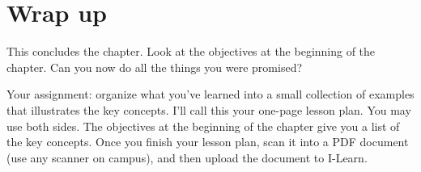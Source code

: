 \section*{Wrap up}

This concludes the chapter.  Look at the objectives at the beginning of the chapter. Can you now do all the things you were promised? 


\begin{problem} 
Your assignment: organize what you've learned into a small collection of examples that illustrates the key concepts. I'll call this your one-page lesson plan. You may use both sides. The objectives at the beginning of the chapter give you a list of the key concepts. Once you finish your lesson plan, scan it into a PDF document (use any scanner on campus), and then upload the document to I-Learn.
\end{problem}









